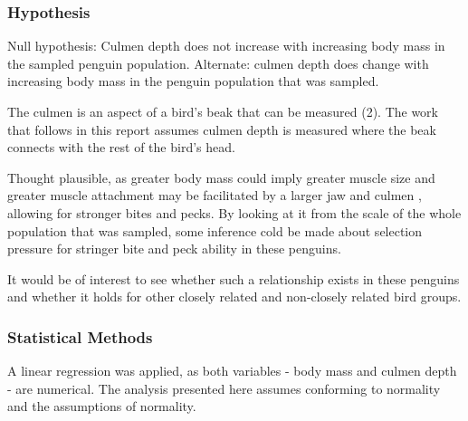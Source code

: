 \documentclass[
]{article}
\newenvironment{Shaded}{\begin{snugshade}}{\end{snugshade}}
\newcommand{\AlertTok}[1]{\textcolor[rgb]{0.94,0.16,0.16}{#1}}
\newcommand{\CommentTok}[1]{\textcolor[rgb]{0.56,0.35,0.01}{\textit{#1}}}
\newcommand{\FunctionTok}[1]{\textcolor[rgb]{0.13,0.29,0.53}{\textbf{#1}}}
\newcommand{\NormalTok}[1]{#1}
\newcommand{\StringTok}[1]{\textcolor[rgb]{0.31,0.60,0.02}{#1}}
\begin{document}
\begin{Shaded}
\end{Shaded}

\hypertarget{hypothesis}{%
\subsubsection{Hypothesis}\label{hypothesis}}

Null hypothesis: Culmen depth does not increase with increasing body
mass in the sampled penguin population. Alternate: culmen depth does
change with increasing body mass in the penguin population that was
sampled.

The culmen is an aspect of a bird's beak that can be measured (2). The
work that follows in this report assumes culmen depth is measured where
the beak connects with the rest of the bird's head.

Thought plausible, as greater body mass could imply greater muscle size
and greater muscle attachment may be facilitated by a larger jaw and
culmen , allowing for stronger bites and pecks. By looking at it from
the scale of the whole population that was sampled, some inference cold
be made about selection pressure for stringer bite and peck ability in
these penguins.

It would be of interest to see whether such a relationship exists in
these penguins and whether it holds for other closely related and
non-closely related bird groups.

\hypertarget{statistical-methods}{%
\subsubsection{Statistical Methods}\label{statistical-methods}}

A linear regression was applied, as both variables - body mass and
culmen depth - are numerical. The analysis presented here assumes
conforming to normality and the assumptions of normality.
\end{document}

